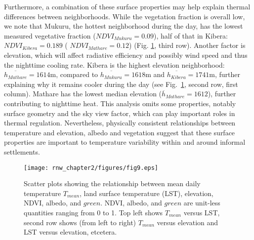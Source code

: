 Furthermore, a combination of these surface properties may help explain thermal differences between neighborhoods. 
While the vegetation fraction is overall low, we note that Mukuru, the hottest neighborhood during the day, has the lowest measured vegetative fraction ($NDVI_{Mukuru} =  0.09 $), half of that in Kibera: $NDVI_{Kibera} =  0.189 $ ( $NDVI_{Mathare} =  0.12 $) (Fig. \ref{surface}, third row).
 Another factor is elevation, which will affect radiative efficiency and possibly wind speed  and thus the nighttime cooling rate. Kibera is the highest elevation neighborhood: $\overline{h_{Mathare}}=1614$m, compared to $\overline{h_{Mukuru}} = 1618$m and $\overline{h_{Kibera}} = 1741$m, further explaining why it remains cooler during the day (see Fig.~\ref{surface}, second row, first column).  Mathare has the lowest median elevation ($\overline{h}_{Mathare} = 1612$), further contributing to nighttime heat. This analysis omits some properties, notably surface geometry and the sky view factor, which can play important roles in thermal regulation. Nevertheless, physically consistent relationships between temperature and elevation, albedo and vegetation suggest that these surface properties are important to temperature variability within and around informal settlements. 

\begin{figure}
\texttt{[image: rnw\_chapter2/figures/fig9.eps]}
\caption{%
Scatter plots showing the relationship between mean daily temperature $T_{mean}$, land surface temperature (LST), elevation, NDVI, albedo, and $green$. %
NDVI, albedo, and $green$ are unit-less quantities ranging from 0 to 1.  Top left shows $T_{mean}$ versus LST, second row shows (from left to right) $T_{mean} $ versus elevation and LST versus elevation, etcetera.    }
\label{surface}
\end{figure}

